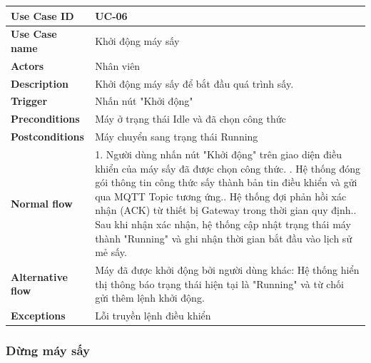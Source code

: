 \begin{tabular}{|p{3.5cm}|p{9.5cm}|}
\hline
\textbf{Use Case ID} & UC-06 \\
\hline
\textbf{Use Case name} & Khởi động máy sấy \\
\hline
\textbf{Actors} & Nhân viên \\
\hline
\textbf{Description} & 
Khởi động máy sấy để bắt đầu quá trình sấy. \\
\hline
\textbf{Trigger} & Nhấn nút "Khởi động" \\
\hline
\textbf{Preconditions} & Máy ở trạng thái Idle và đã chọn công thức \\
\hline
\textbf{Postconditions} & Máy chuyển sang trạng thái Running \\
\hline
\textbf{Normal flow} & 
1. Người dùng nhấn nút "Khởi động" trên giao diện điều khiển của máy sấy đã được chọn công thức. \newline
2. Hệ thống đóng gói thông tin công thức sấy thành bản tin điều khiển và gửi qua MQTT Topic tương ứng.\newline
3. Hệ thống đợi phản hồi xác nhận (ACK) từ thiết bị Gateway trong thời gian quy định.\newline
4. Sau khi nhận xác nhận, hệ thống cập nhật trạng thái máy thành "Running" và ghi nhận thời gian bắt đầu vào lịch sử mẻ sấy. \\
\hline
\textbf{Alternative flow} & 
 Máy đã được khởi động bởi người dùng khác: Hệ thống hiển thị thông báo trạng thái hiện tại là "Running" và từ chối gửi thêm lệnh khởi động. \\
\hline
\textbf{Exceptions} & Lỗi truyền lệnh điều khiển \\
\hline
\end{tabular}

\subsubsection{Dừng máy sấy}

